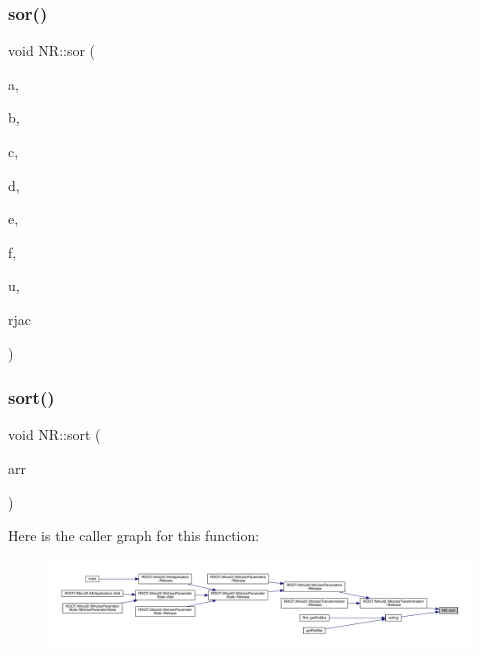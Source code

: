 \mbox{\label{namespaceNR_a20465364d77d93fb2f8ec0a0aca6f509}} 
\subsubsection{\texorpdfstring{sor()}{sor()}}
{\footnotesize\ttfamily void N\+R\+::sor (\begin{DoxyParamCaption}\item[{\mbox{\hyperlink{namespaceNR_a2b8abfda8fffad6ba0a1b5a4c0773dbf}{Mat\+\_\+\+I\+\_\+\+DP}} \&}]{a,  }\item[{\mbox{\hyperlink{namespaceNR_a2b8abfda8fffad6ba0a1b5a4c0773dbf}{Mat\+\_\+\+I\+\_\+\+DP}} \&}]{b,  }\item[{\mbox{\hyperlink{namespaceNR_a2b8abfda8fffad6ba0a1b5a4c0773dbf}{Mat\+\_\+\+I\+\_\+\+DP}} \&}]{c,  }\item[{\mbox{\hyperlink{namespaceNR_a2b8abfda8fffad6ba0a1b5a4c0773dbf}{Mat\+\_\+\+I\+\_\+\+DP}} \&}]{d,  }\item[{\mbox{\hyperlink{namespaceNR_a2b8abfda8fffad6ba0a1b5a4c0773dbf}{Mat\+\_\+\+I\+\_\+\+DP}} \&}]{e,  }\item[{\mbox{\hyperlink{namespaceNR_a2b8abfda8fffad6ba0a1b5a4c0773dbf}{Mat\+\_\+\+I\+\_\+\+DP}} \&}]{f,  }\item[{\mbox{\hyperlink{namespaceNR_ad1513aa4697878ed3bff0b8b3c9dd910}{Mat\+\_\+\+I\+O\+\_\+\+DP}} \&}]{u,  }\item[{const \mbox{\hyperlink{namespaceNR_af6ff762dd605ff477b8e52387253a02a}{DP}}}]{rjac }\end{DoxyParamCaption})}

\mbox{\label{namespaceNR_a3cdf7710dd309ccdfedbf8a5cc6e3797}} 
\subsubsection{\texorpdfstring{sort()}{sort()}}
{\footnotesize\ttfamily void N\+R\+::sort (\begin{DoxyParamCaption}\item[{\mbox{\hyperlink{namespaceNR_ab293e06a6bf799d8a7ed932b6852bcb8}{Vec\+\_\+\+I\+O\+\_\+\+DP}} \&}]{arr }\end{DoxyParamCaption})}

Here is the caller graph for this function\+:
\nopagebreak
\begin{figure}[H]
\begin{center}
\leavevmode
\includegraphics[width=350pt]{da/d46/namespaceNR_a3cdf7710dd309ccdfedbf8a5cc6e3797_icgraph}
\end{center}
\end{figure}
\mbox{\label{namespaceNR_aac9ed2f59dae4ff79ef08dd3df8f3120}} 
